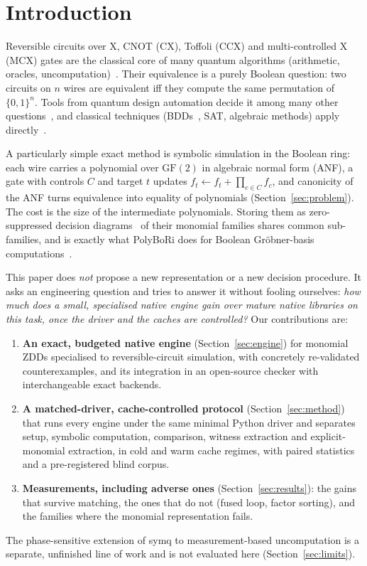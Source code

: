 \documentclass[10pt,a4paper]{article}
\theoremstyle{definition}
\newcommand{\symq}{\textsf{symq}}
\newcommand{\GF}{\mathrm{GF}(2)}
\begin{document}
\section{Introduction}

Reversible circuits over X, CNOT (CX), Toffoli (CCX) and multi-controlled X (MCX) gates are
the classical core of many quantum algorithms (arithmetic, oracles,
uncomputation)~\cite{wille2008revlib,gidney2018halving}. Their equivalence is a purely Boolean
question: two circuits on $n$ wires are equivalent iff they compute the same permutation of
$\{0,1\}^n$. Tools from quantum design automation decide it among many other
questions~\cite{burgholzer2021advanced}, and classical techniques (BDDs~\cite{bryant1986graph},
SAT, algebraic methods) apply directly~\cite{wille2009equivalence}.

A particularly simple exact method is symbolic simulation in the Boolean ring: each wire
carries a polynomial over $\GF$ in algebraic normal form (ANF), a gate with controls $C$ and
target $t$ updates $f_t \leftarrow f_t + \prod_{c\in C} f_c$, and canonicity of the ANF turns
equivalence into equality of polynomials (Section~\ref{sec:problem}). The cost is the size of
the intermediate polynomials. Storing them as zero-suppressed decision
diagrams~\cite{minato1993zdd} of their monomial families shares common sub-families, and is
exactly what PolyBoRi does for Boolean Gr\"obner-basis
computations~\cite{brickenstein2009polybori}.

This paper does \emph{not} propose a new representation or a new decision procedure. It asks
an engineering question and tries to answer it without fooling ourselves: \emph{how much does
a small, specialised native engine gain over mature native libraries on this task, once the
driver and the caches are controlled?} Our contributions are:
\begin{enumerate}
  \item \textbf{An exact, budgeted native engine} (Section~\ref{sec:engine}) for monomial ZDDs
  specialised to reversible-circuit simulation, with concretely re-validated counterexamples,
  and its integration in an open-source checker with interchangeable exact backends.
  \item \textbf{A matched-driver, cache-controlled protocol} (Section~\ref{sec:method}) that
  runs every engine under the same minimal Python driver and separates setup, symbolic
  computation, comparison, witness extraction and explicit-monomial extraction, in cold and
  warm cache regimes, with paired statistics and a pre-registered blind corpus.
  \item \textbf{Measurements, including adverse ones} (Section~\ref{sec:results}): the gains
  that survive matching, the ones that do not (fused loop, factor sorting), and the families
  where the monomial representation fails.
\end{enumerate}
The phase-sensitive extension of \symq{} to measurement-based uncomputation is a separate,
unfinished line of work and is not evaluated here (Section~\ref{sec:limits}).
\end{document}
